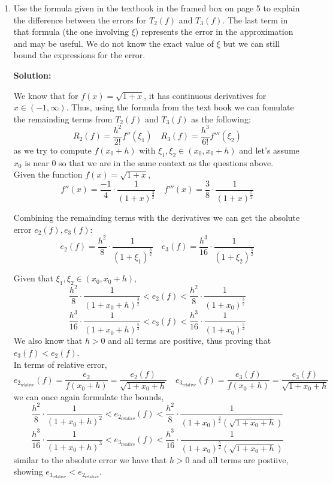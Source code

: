 \documentclass[11pt]{article}
\newenvironment{solution}
  {\par\noindent\textbf{Solution:}\par}
  {\par}
\begin{document}
\begin{enumerate}
\begin{enumerate}
\item Use the formula given in the textbook in the framed box on page 5 to explain the difference between the errors for $T_2(f)$ and $T_3(f)$. The last term in that formula (the one involving $\xi$) represents the error in the approximation and may be useful. We do not know the exact value of $\xi$ but we can still bound the expressions for the error.
  \begin{solution}
    We know that for $f(x) =\sqrt{1+x}$, it has continuous derivatives for $x \in (-1, \infty)$. Thus, using the formula from the text book 
    we can fomulate the remainding terms from $T_2(f)$ and $T_3(f)$ as the following: 
    $$R_2(f) = \frac{h^2}{2!}f''(\xi_1) \quad R_3(f) = \frac{h^3}{6!}f'''(\xi_2)$$
    as we try to compute $f(x_0 + h)$ with $\xi_1,\xi_2 \in (x_0, x_0 +h)$ and let's assume $x_0$ is near 0 so that we are in the same context as the questions above.
    \\ 
    Given the function $f(x) = \sqrt{1+x}$,
    $$f''(x) = \frac{-1}{4} \cdot \frac{1}{(1+x)^{\frac{3}{2}}} \quad f'''(x) = \frac{3}{8}\cdot \frac{1}{(1+x)^{\frac{5}{2}}}$$

    Combining the remainding terms with the derivatives we can get the absolute error $e_2(f),e_3(f)$:
    $$e_2(f) = \frac{h^2}{8} \cdot \frac{1}{(1+\xi_1)^{\frac{3}{2}}} \quad e_3(f) = \frac{h^3}{16} \cdot \frac{1}{(1+\xi_2)^{\frac{5}{2}}}$$

    Given that $\xi_1,\xi_2 \in (x_0, x_0 + h)$,
    $$\frac{h^2}{8} \cdot \frac{1}{(1+x_0 + h)^{\frac{3}{2}}} < e_2(f) <  \frac{h^2}{8} \cdot \frac{1}{(1+x_0)^{\frac{3}{2}}}   $$
    $$\frac{h^3}{16} \cdot \frac{1}{(1+x_0+h)^{\frac{5}{2}}} < e_3(f) < \frac{h^3}{16} \cdot \frac{1}{(1+x_0)^{\frac{5}{2}}} $$
    We also know that $h > 0$ and all terms are positive, thus proving that $e_3(f) < e_2(f)$.
    \\ 

    In terms of relative error, 
    $$e_{2_\text{relative}}(f) = \frac{e_2}{f(x_0+h)} = \frac{e_2(f)}{\sqrt{1+x_0+h}} \quad e_{3_\text{relative}}(f) = \frac{e_3(f)}{f(x_0+h)} = \frac{e_3(f)}{\sqrt{1+x_0+h}}$$
    we can once again formulate the bounds,
  $$\frac{h^2}{8} \cdot \frac{1}{(1+x_0 + h)^{2}} < e_{2_\text{relative}}(f) <  \frac{h^2}{8} \cdot \frac{1}{(1+x_0)^{\frac{3}{2} }(\sqrt{1+x_0+h})}   $$
    $$\frac{h^3}{16} \cdot \frac{1}{(1+x_0+h)^{3}} < e_{3_\text{relative}}(f) < \frac{h^3}{16} \cdot \frac{1}{(1+x_0)^{\frac{5}{2}} (\sqrt{1+x_0+h})} $$
    similar to the absolute error we have that $h>0$ and all terms are postiive, showing $e_{3_\text{relative}} < e_{2_\text{relative}}$. 


\end{solution}
\end{enumerate}
\end{enumerate}
\end{document}
